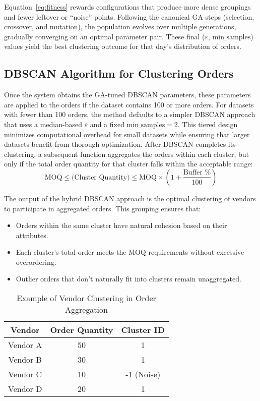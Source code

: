 Equation~\ref{eq:fitness} rewards configurations that produce more dense groupings and fewer leftover or ``noise'' points. Following the canonical GA steps (selection, crossover, and mutation), the population evolves over multiple generations, gradually converging on an optimal parameter pair. These final ($\varepsilon$, $\text{min\_samples}$) values yield the best clustering outcome for that day's distribution of orders.

\subsection{DBSCAN Algorithm for Clustering Orders}

Once the system obtains the GA-tuned DBSCAN parameters, these parameters are applied to the orders if the dataset contains 100 or more orders. For datasets with fewer than 100 orders, the method defaults to a simpler DBSCAN approach that uses a median-based $\varepsilon$ and a fixed $\text{min\_samples} = 2$. This tiered design minimizes computational overhead for small datasets while ensuring that larger datasets benefit from thorough optimization. After DBSCAN completes its clustering, a subsequent function aggregates the orders within each cluster, but only if the total order quantity for that cluster falls within the acceptable range:
\begin{equation}
    \text{MOQ} \leq \text{(Cluster Quantity)} \leq \text{MOQ} \times \left(1 + \frac{\text{Buffer \%}}{100}\right)
    \label{eq:moq}
\end{equation}



The output of the hybrid DBSCAN approach is the optimal clustering of vendors to participate in aggregated orders. This grouping ensures that:

\begin{itemize}
    \item Orders within the same cluster have natural cohesion based on their attributes.
    \item Each cluster's total order meets the MOQ requirements without excessive overordering.
    \item Outlier orders that don't naturally fit into clusters remain unaggregated.
\end{itemize}

\begin{table}[h!]
    \centering
    \begin{tabular}{|c|c|c|}
        \hline
        \textbf{Vendor} & \textbf{Order Quantity} & \textbf{Cluster ID} \\
        \hline
        Vendor A        & 50                      & 1                   \\
        Vendor B        & 30                      & 1                   \\
        Vendor C        & 10                      & -1 (Noise)          \\
        Vendor D        & 20                      & 1                   \\
        \hline
    \end{tabular}
    \caption{Example of Vendor Clustering in Order Aggregation}
\end{table}

